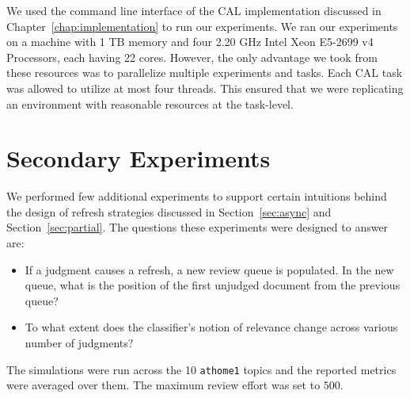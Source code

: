 We used the command line interface of the CAL implementation discussed in
Chapter~\ref{chap:implementation} to run our experiments. We ran our experiments
on a machine with 1 TB memory and four 2.20 GHz Intel Xeon E5-2699 v4 Processors, each having 22 cores.
However, the only advantage we took from these resources was to parallelize
multiple experiments and tasks. Each CAL task was allowed to utilize at most
four threads. This ensured that we were replicating an environment with
reasonable resources at the task-level.

\section{Secondary Experiments}


We performed few additional experiments to support certain intuitions behind the
design of refresh strategies discussed in Section~\ref{sec:async} and
Section~\ref{sec:partial}. The questions these experiments were designed to
answer are:
\begin{itemize}
    \item If a judgment causes a refresh, a new review queue is populated.
        In the new queue, what is the position of the first unjudged document
        from the previous queue?
    \item To what extent does the classifier's notion of relevance change across
        various number of judgments?
\end{itemize}

The simulations were run across the 10
\texttt{athome1} topics and the reported metrics were averaged over them. The
maximum review effort was set to $500$.
